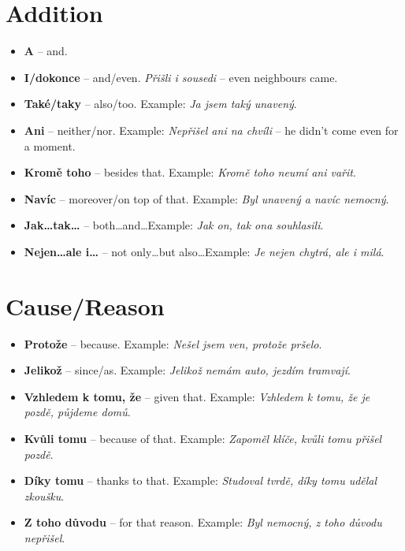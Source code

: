 \documentclass[12pt]{book}
\begin{document}
\section{Addition}
\begin{itemize}
    \item \textbf{A} -- and.
    \item \textbf{I/dokonce} -- and/even. \emph{Přišli i sousedi} -- even neighbours came.
    \item \textbf{Také/taky} -- also/too. Example: \emph{Ja jsem taký unavený}.
    \item \textbf{Ani} -- neither/nor. Example: \emph{Nepřišel ani na chvíli} -- he didn't come even for a moment.
    \item \textbf{Kromě toho} -- besides that. Example: \emph{Kromě toho neumí ani vařit}.
    \item \textbf{Navíc} -- moreover/on top of that. Example: \emph{Byl unavený a navíc nemocný}.
    \item \textbf{Jak\dots tak\dots} -- both\dots and\dots Example: \emph{Jak on, tak ona souhlasili}.
    \item \textbf{Nejen\dots ale i\dots} -- not only\dots but also\dots Example: \emph{Je nejen chytrá, ale i milá}.
\end{itemize}

\section{Cause/Reason}
\begin{itemize}
    \item \textbf{Protože} -- because. Example: \emph{Nešel jsem ven, protože pršelo}.
    \item \textbf{Jelikož} -- since/as. Example: \emph{Jelikož nemám auto, jezdím tramvají}.
    \item \textbf{Vzhledem k tomu, že} -- given that. Example: \emph{Vzhledem k tomu, že je pozdě, půjdeme domů}.
    \item \textbf{Kvůli tomu} -- because of that. Example: \emph{Zapoměl klíče, kvůli tomu přišel pozdě}.
    \item \textbf{Díky tomu} -- thanks to that. Example: \emph{Studoval tvrdě, díky tomu udělal zkoušku}.
    \item \textbf{Z toho důvodu} -- for that reason. Example: \emph{Byl nemocný, z toho důvodu nepřišel}.
\end{itemize}
\end{document}
